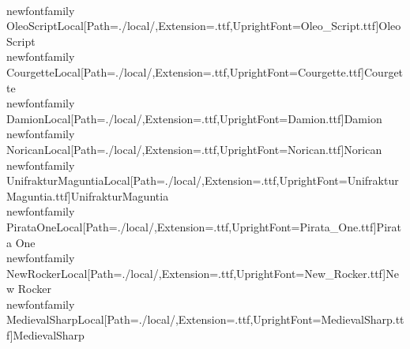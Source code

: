 \\newfontfamily\\OleoScriptLocal[Path=./local/,Extension=.ttf,UprightFont={Oleo_Script.ttf}]{Oleo Script}
\\newfontfamily\\CourgetteLocal[Path=./local/,Extension=.ttf,UprightFont={Courgette.ttf}]{Courgette}
\\newfontfamily\\DamionLocal[Path=./local/,Extension=.ttf,UprightFont={Damion.ttf}]{Damion}
\\newfontfamily\\NoricanLocal[Path=./local/,Extension=.ttf,UprightFont={Norican.ttf}]{Norican}
\\newfontfamily\\UnifrakturMaguntiaLocal[Path=./local/,Extension=.ttf,UprightFont={UnifrakturMaguntia.ttf}]{UnifrakturMaguntia}
\\newfontfamily\\PirataOneLocal[Path=./local/,Extension=.ttf,UprightFont={Pirata_One.ttf}]{Pirata One}
\\newfontfamily\\NewRockerLocal[Path=./local/,Extension=.ttf,UprightFont={New_Rocker.ttf}]{New Rocker}
\\newfontfamily\\MedievalSharpLocal[Path=./local/,Extension=.ttf,UprightFont={MedievalSharp.ttf}]{MedievalSharp}
